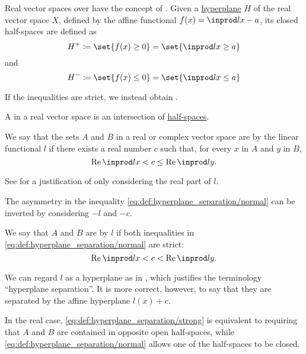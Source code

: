 \begin{definition}\label{def:half_space}
  Real vector spaces over have the concept of . Given a \hyperref[def:hyperplane]{hyperplane} \( H \) of the real vector space \( X \), defined by the affine functional \( f(x) = \inprod l x - a \), its closed half-spaces are defined as
  \begin{equation*}
    H^+ \coloneqq \set{ f(x) \geq 0 } = \set{ \inprod l x \geq a }
  \end{equation*}
  and
  \begin{equation*}
    H^- \coloneqq \set{ f(x) \leq 0 } = \set{ \inprod l x \leq a }
  \end{equation*}

  If the inequalities are strict, we instead obtain .
\end{definition}

\begin{definition}\label{def:polyhedron}\mimprovised
  A  in a real vector space is an intersection of \hyperref[def:half_space]{half-spaces}.
\end{definition}

\begin{definition}\label{def:hyperplane_separation}\mimprovised
  We say that the sets \( A \) and \( B \) in a real or complex vector space are  by the linear functional \( l \) if there exists a real number \( c \) such that, for every \( x \) in \( A \) and \( y \) in \( B \),
  \begin{equation}\label{eq:def:hyperplane_separation/normal}
    \real \inprod l x < c \leq \real \inprod l y.
  \end{equation}

  See  for a justification of only considering the real part of \( l \).

  The asymmetry in the inequality \eqref{eq:def:hyperplane_separation/normal} can be inverted by considering \( -l \) and \( -c \).

  We say that \( A \) and \( B \) are  by \( l \) if both inequalities in \eqref{eq:def:hyperplane_separation/normal} are strict:
  \begin{equation}\label{eq:def:hyperplane_separation/strong}
    \real \inprod l x < c < \real \inprod l y.
  \end{equation}

  We can regard \( l \) as a hyperplane as in , which justifies the terminology \enquote{hyperplane separation}. It is more correct, however, to say that they are separated by the affine hyperplane \( l(x) + c \).

  In the real case, \eqref{eq:def:hyperplane_separation/strong} is equivalent to requiring that \( A \) and \( B \) are contained in opposite open half-spaces, while \eqref{eq:def:hyperplane_separation/normal} allows one of the half-spaces to be closed.
\end{definition}

